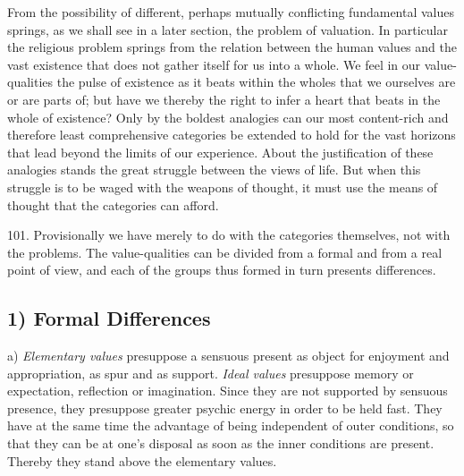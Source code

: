 \documentclass[12pt,a4paper]{book}
\newcommand{\opage}[1]{\marginnote{\footnotesize\textit{[#1]}}}
\begin{document}
From the possibility of different, perhaps mutually conflicting fundamental
values springs, as we shall see in a later section, the problem of valuation.
In particular the religious problem springs from the relation between the
human values and the vast existence that does not gather itself \opage{241}for us into a
whole. We feel in our value-qualities the pulse of existence as it beats
within the wholes that we ourselves are or are parts of; but have we thereby
the right to infer a heart that beats in the whole of existence? Only by the
boldest analogies can our most content-rich and therefore least comprehensive
categories be extended to hold for the vast horizons that lead beyond the
limits of our experience. About the justification of these analogies stands
the great struggle between the views of life. But when this struggle is to be
waged with the weapons of thought, it must use the means of thought that the
categories can afford.

101. Provisionally we have merely to do with the categories themselves, not
with the problems. The value-qualities can be divided from a formal and from a
real point of view, and each of the groups thus formed in turn presents
differences.

\subsection*{1) Formal Differences}

a) \emph{Elementary values} presuppose a sensuous present as object for
enjoyment and appropriation, as spur and as support. \emph{Ideal values}
presuppose memory or expectation, reflection or imagination. Since they are
not supported by sensuous presence, they presuppose greater psychic energy in
order to be held fast. They have at the same time the advantage of being
independent of outer conditions, so that they can be at one's disposal as soon
as the inner conditions are present. Thereby they stand above the elementary
values.
\end{document}

